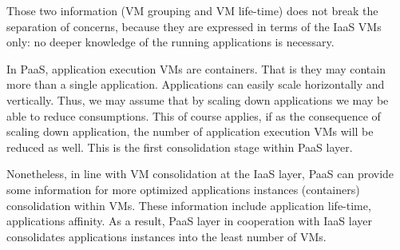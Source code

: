 Those two information (VM grouping and VM life-time) does not break the separation of concerns, because they are expressed in terms of the IaaS VMs only: no deeper knowledge of the running applications is necessary.

In PaaS, application execution VMs are containers.
That is they may contain more than a single application.
Applications can easily scale horizontally and vertically. 
Thus, we may assume that by scaling down applications we may be able to reduce consumptions. 
This of course applies, if as the consequence of scaling down application, the number of application execution VMs will be reduced as well.
This is the first consolidation stage within PaaS layer.


Nonetheless, in line with VM consolidation at the IaaS layer, PaaS can provide some information for more optimized applications instances (containers) consolidation within VMs. 
These information include application life-time, applications affinity. 
As a result, PaaS layer in cooperation with IaaS layer consolidates applications instances into the least number of VMs.%





